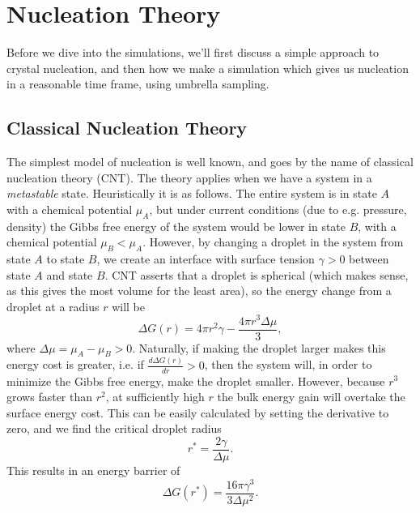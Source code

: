 \documentclass[thesis]{subfiles}
\begin{document}
\section{Nucleation Theory}

Before we dive into the simulations, we'll first discuss a simple approach to crystal nucleation, and then how we make a simulation which gives us nucleation in a reasonable time frame, using umbrella sampling.

\subsection{Classical Nucleation Theory}

The simplest model of nucleation is well known, and goes by the name of classical nucleation theory (CNT). The theory applies when we have a system in a \emph{metastable} state. Heuristically it is as follows. The entire system is in state $A$ with a chemical potential $\mu_A$, but under current conditions (due to e.g. pressure, density) the Gibbs free energy of the system would be lower in state $B$, with a chemical potential $\mu_B < \mu_A$. However, by changing a droplet in the system from state $A$ to state $B$, we create an interface with surface tension $\gamma > 0$ between state $A$ and state $B$. CNT asserts that a droplet is spherical (which makes sense, as this gives the most volume for the least area), so the energy change from a droplet at a radius $r$ will be	
\begin{equation}
	\Delta G(r) = 4\pi r^2 \gamma - \frac{4\pi r^3 \Delta\mu}{3},
\end{equation}
where $\Delta\mu = \mu_A - \mu_B > 0$. Naturally, if making the droplet larger makes this energy cost is greater, i.e. if $\frac{d\Delta G(r)}{dr} > 0$, %
then the system will, in order to minimize the Gibbs free energy, make the droplet smaller. However, because $r^3$ grows faster than $r^2$, at sufficiently high $r$ the bulk energy gain will overtake the surface energy cost. This can be easily calculated by setting the derivative to zero, and we find the critical droplet radius
\begin{equation}
	r^* = \frac{2\gamma}{\Delta\mu}.
\end{equation}
This results in an energy barrier of 
\begin{equation}
	\Delta G (r^*) = \frac{16 \pi \gamma^3}{3 \Delta\mu^2}.
\end{equation}
\end{document}
